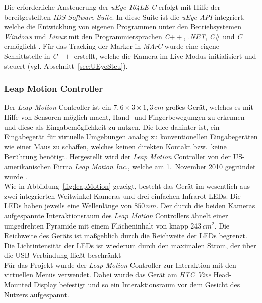 Die erforderliche Ansteuerung der \textit{uEye 164LE-C} erfolgt mit Hilfe der bereitgestellten \textit{IDS Software Suite}. In diese Suite ist die \textit{uEye-API} integriert, welche die Entwicklung von eigenen Programmen unter den Betriebsystemen \textit{Windows} und \textit{Linux} mit den Programmiersprachen \textit{C}$++$, \textit{.NET}, \textit{C$\#$} und \textit{C} ermöglicht \cite{website:IDSSuite}. Für das Tracking der Marker in \textit{MArC} wurde eine eigene Schnittstelle in \textit{C}$++$ erstellt, welche die Kamera im Live Modus initialisiert und steuert (vgl. Abschnitt~\ref{sec:UEyeSteu}).

\subsubsection{Leap Motion Controller}\label{sec:LeapMotion} 
Der \textit{Leap Motion} Controller \cite{website:LeapMotion} ist ein $7,6\times3\times1,3\,cm$ großes Gerät, welches es mit Hilfe von Sensoren möglich macht, Hand- und Fingerbewegungen zu erkennen und diese als Eingabemöglichkeit zu nutzen. Die Idee dahinter ist, ein Eingabegerät für virtuelle Umgebungen analog zu konventionellen Eingabegeräten wie einer Maus zu schaffen, welches keinen direkten Kontakt bzw.\ keine Berührung benötigt. Hergestellt wird der \textit{Leap Motion} Controller von der US-amerikanischen Firma \emph{Leap Motion Inc.}, welche am 1.\ November 2010 gegründet wurde \cite{website:LeapMotion}.\\
Wie in Abbildung~\ref{fig:leapMotion} gezeigt, besteht das Gerät im wesentlich aus zwei integrierten Weitwinkel-Kameras und drei einfachen Infrarot-LEDs. Die LEDs haben jeweils eine Wellenlänge von $850\,nm$. Der durch die beiden Kameras aufgespannte Interaktionsraum des \textit{Leap Motion} Controllers ähnelt einer umgedrehten Pyramide mit einem Flächeninhalt von knapp $243\,cm{^2}$. Die Reichweite des Geräts ist maßgeblich durch die Reichweite der LEDs begrenzt. Die Lichtintensität der LEDs ist wiederum durch den maximalen Strom, der über die USB-Verbindung fließt beschränkt~\cite{website:LeapMotionBlog}\\
Für das Projekt wurde der \textit{Leap Motion} Controller zur Interaktion mit den virtuellen Menüs verwendet. Dabei wurde das Gerät am \textit{HTC Vive} Head-Mounted Display befestigt und so ein Interaktionsraum vor dem Gesicht des Nutzers aufgespannt.


